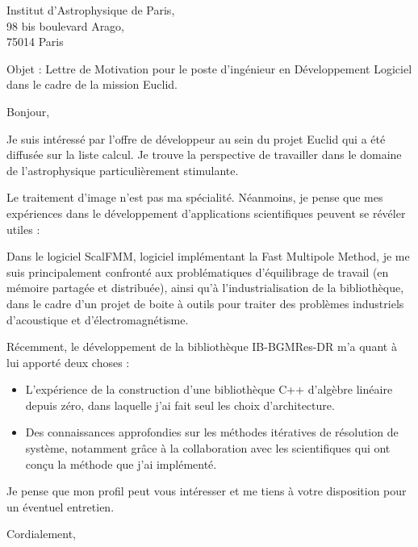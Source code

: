 \documentclass[12pt,a4paper]{letter}
\begin{document}
\begin{letter}{Institut d'Astrophysique de Paris,\\
    98 bis boulevard Arago, \\
    75014 Paris}

  \vspace*{-10\baselineskip}

  \opening{Objet : Lettre de Motivation pour le poste d'ingénieur en
    Développement Logiciel dans le cadre de la mission Euclid.}

  Bonjour,

  Je suis intéressé par l'offre de développeur au sein du projet
  Euclid qui a été diffusée sur la liste calcul. Je trouve la
  perspective de travailler dans le domaine de l'astrophysique
  particulièrement stimulante.

  Le traitement d'image n'est pas ma spécialité. Néanmoins, je pense
  que mes expériences dans le développement d'applications
  scientifiques peuvent se révéler utiles :

  Dans le logiciel ScalFMM, logiciel implémentant la Fast Multipole
  Method, je me suis principalement confronté aux problématiques
  d'équilibrage de travail (en mémoire partagée et distribuée), ainsi
  qu'à l'industrialisation de la bibliothèque, dans le cadre d'un
  projet de boite à outils pour traiter des problèmes industriels
  d'acoustique et d'électromagnétisme.

  Récemment, le développement de la bibliothèque IB-BGMRes-DR m'a
  quant à lui apporté deux choses :
  \begin{itemize}
  \item L'expérience de la construction d'une bibliothèque C++
    d'algèbre linéaire depuis zéro, dans laquelle j'ai fait seul les
    choix d'architecture.
  \item Des connaissances approfondies sur les méthodes itératives de
    résolution de système, notamment grâce à la collaboration avec les
    scientifiques qui ont conçu la méthode que j'ai implémenté.
  \end{itemize}


  Je pense que mon profil peut vous intéresser et me tiens à votre
  disposition pour un éventuel entretien.

  \closing{Cordialement,}


\end{letter}
\end{document}
